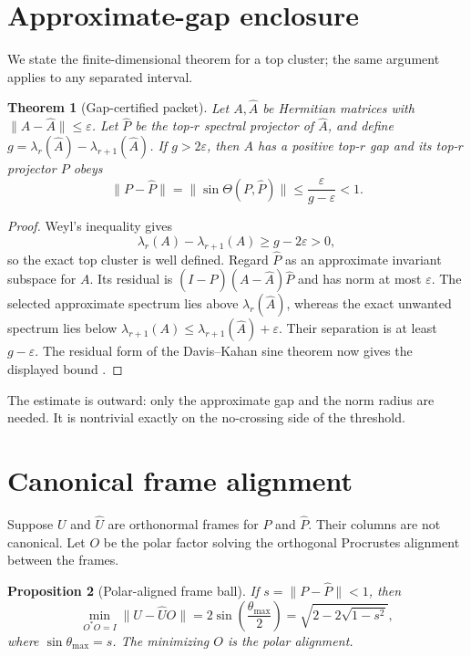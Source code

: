 \documentclass[12pt]{article}
\newtheorem{theorem}{Theorem}
\newtheorem{proposition}[theorem]{Proposition}
\begin{document}
\section{Approximate-gap enclosure}
We state the finite-dimensional theorem for a top cluster; the same argument
applies to any separated interval.

\begin{theorem}[Gap-certified packet]\label{thm:packet}
Let $A,\widehat A$ be Hermitian matrices with
$\|A-\widehat A\|\leq\varepsilon$.  Let $\widehat P$ be the top-$r$
spectral projector of $\widehat A$, and define
$g=\lambda_r(\widehat A)-\lambda_{r+1}(\widehat A)$.  If
$g>2\varepsilon$, then $A$ has a positive top-$r$ gap and its top-$r$
projector $P$ obeys
\[
 \|P-\widehat P\|
 =\|\sin\Theta(P,\widehat P)\|
 \leq \frac{\varepsilon}{g-\varepsilon}<1.
\]
\end{theorem}

\begin{proof}
Weyl's inequality gives
\[
 \lambda_r(A)-\lambda_{r+1}(A)\geq g-2\varepsilon>0,
\]
so the exact top cluster is well defined.  Regard $\widehat P$ as an
approximate invariant subspace for $A$.  Its residual is
$(I-\widehat P)(A-\widehat A)\widehat P$ and has norm at most
$\varepsilon$.  The selected approximate spectrum lies above
$\lambda_r(\widehat A)$, whereas the exact unwanted spectrum lies below
$\lambda_{r+1}(A)\leq\lambda_{r+1}(\widehat A)+\varepsilon$.
Their separation is at least $g-\varepsilon$.  The residual form of the
Davis--Kahan sine theorem now gives the displayed bound
\citep{DavisKahan1970,StewartSun1990}.
\end{proof}

The estimate is outward: only the approximate gap and the norm radius are
needed.  It is nontrivial exactly on the no-crossing side of the threshold.

\section{Canonical frame alignment}
Suppose $U$ and $\widehat U$ are orthonormal frames for $P$ and
$\widehat P$.  Their columns are not canonical.  Let $O$ be the polar factor
solving the orthogonal Procrustes alignment between the frames.

\begin{proposition}[Polar-aligned frame ball]\label{prop:frame}
If $s=\|P-\widehat P\|<1$, then
\[
 \min_{O^*O=I}\|U-\widehat UO\|
 =2\sin\!\left(\frac{\theta_{\max}}2\right)
 =\sqrt{2-2\sqrt{1-s^2}},
\]
where $\sin\theta_{\max}=s$.  The minimizing $O$ is the polar alignment.
\end{proposition}
\end{document}
